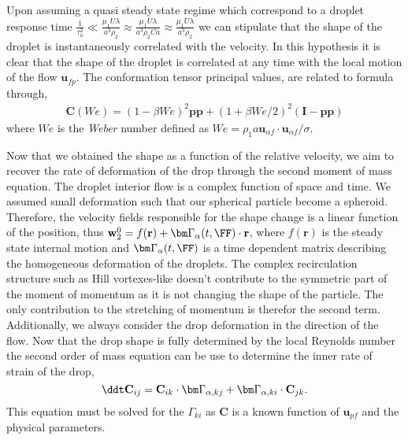 Upon assuming a quasi steady state regime which correspond to a droplet response time $\frac{1}{\tau_a^2} \ll \frac{\mu_1 U \lambda }{a^3\rho_2} \approx \frac{\mu_1 U \lambda }{a^3\rho_2 Ca} \approx \frac{\mu_1 U \lambda }{a^3\rho_2}$ we can stipulate that the shape of the droplet is instantaneously correlated with the velocity. 
In this hypothesis it is clear that the shape of the droplet is correlated at any time with the local motion of the flow $\textbf{u}_{fp}$. 
The conformation tensor principal values, are related to \citet{taylor1964deformation} formula through,
\begin{align*}
    \textbf{C}(\textit{We})
    = (1 - \beta \textit{We} )^2 \textbf{pp}
    + 
     (1 + \beta \textit{We}/2  )^2 (\textbf{I}-\textbf{pp})
\end{align*}
where $\textit{We}$ is the \textit{Weber} number defined as $\textit{We} = \rho_1 a \textbf{u}_{\alpha f}\cdot\textbf{u}_{\alpha f}/\sigma$. 

Now that we obtained the shape as a function of the relative velocity, we aim to recover the rate of deformation of the drop through the second moment of mass equation. 
The droplet interior flow is a complex function of space and time. 
We assumed small deformation such that our spherical particle become a spheroid. 
Therefore, the velocity fields responsible for the shape change is a linear function of the position, thus $\textbf{w}_2^0 = f(\textbf{r}) + \bm\Gamma_\alpha(t,\FF) \cdot \textbf{r}$, where $f(\textbf{r})$ is the steady state internal motion and $\bm\Gamma_\alpha(t,\FF)$ is a time dependent matrix describing the homogeneous deformation of the droplets. 
The complex recirculation structure such as Hill vortexes-like doesn't contribute to the symmetric part of the moment of momentum as it is not changing the shape of the particle. 
The only contribution to the stretching of momentum is therefor the second term. 
Additionally, we always consider the drop deformation in the direction of the flow. 
Now that the drop shape is fully determined by the local Reynolds number the second order of mass equation can be use to determine the inner rate of strain of the drop,
\begin{equation*}
    \ddt \textbf{C}_{ij}
    = \textbf{C}_{ik} \cdot \bm\Gamma_{\alpha,kj}
    +  \bm\Gamma_{\alpha,ki} \cdot \textbf{C}_{jk}.
\end{equation*}
This equation must be solved for the $\Gamma_{ki}$ as $\textbf{C}$ is a known function of $\textbf{u}_{pf}$ and the physical parameters. 

